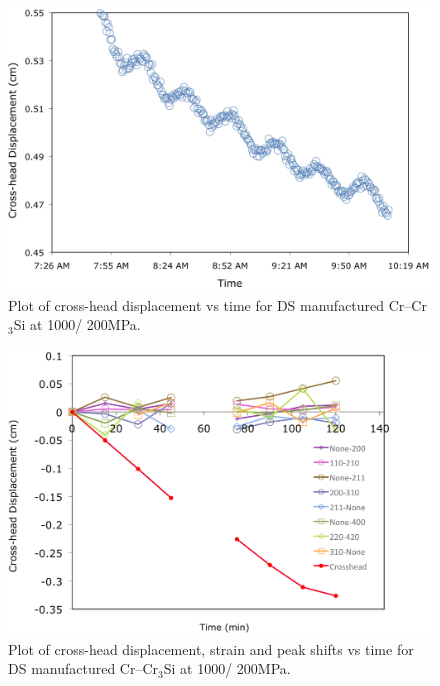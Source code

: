 %
%
\begin{figure}[H]
\begin{center}
\includegraphics[width=12cm]{enginxcr1000C200MPa}
\vspace{-2mm}
\caption{Plot of cross-head displacement vs time for DS manufactured Cr--Cr$_3$Si at 1000\celsius/ 200MPa.}\label{fig:enginxcr1000C200MPa}
\end{center}
\end{figure}  
%
%
\begin{figure}[H]
\begin{center}
\includegraphics[width=15cm]{enginxcr1000C200MPastrain}
\vspace{-2mm}
\caption{Plot of cross-head displacement, strain and peak shifts vs time for DS manufactured Cr--Cr$_3$Si at 1000\celsius/ 200MPa.}\label{fig:enginxcr1000Cstrain}
\end{center}
\end{figure}  
%
%
